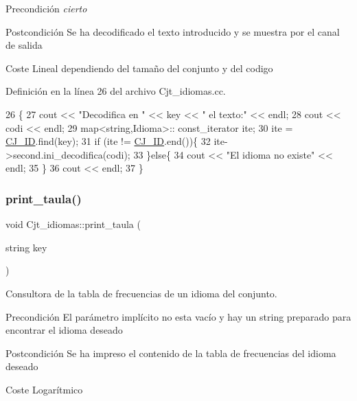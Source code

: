 \begin{DoxyPrecond}{Precondición}
{\itshape cierto} 
\end{DoxyPrecond}
\begin{DoxyPostcond}{Postcondición}
Se ha decodificado el texto introducido y se muestra por el canal de salida 
\end{DoxyPostcond}
\begin{DoxyParagraph}{Coste}
Lineal dependiendo del tamaño del conjunto y del codigo 
\end{DoxyParagraph}


Definición en la línea 26 del archivo Cjt\+\_\+idiomas.\+cc.


\begin{DoxyCode}
26                                                              \{
27   cout << \textcolor{stringliteral}{"Decodifica en "} << key << \textcolor{stringliteral}{" el texto:"} << endl;
28   cout << codi << endl;
29   map<string,Idioma>:: const\_iterator ite;
30   ite = \hyperlink{class_cjt__idiomas_aeb67a7100b1345a160fb85466bd4e5f6}{CJ\_ID}.find(key);
31   \textcolor{keywordflow}{if} (ite != \hyperlink{class_cjt__idiomas_aeb67a7100b1345a160fb85466bd4e5f6}{CJ\_ID}.end())\{
32     ite->second.ini\_decodifica(codi);
33    \}\textcolor{keywordflow}{else}\{
34     cout << \textcolor{stringliteral}{"El idioma no existe"} << endl;
35   \}
36   cout << endl;
37 \}
\end{DoxyCode}
\mbox{\label{class_cjt__idiomas_a9839ea44dc8c3ecbb10b32fe869a3498}} 
\subsubsection{\texorpdfstring{print\+\_\+taula()}{print\_taula()}}
{\footnotesize\ttfamily void Cjt\+\_\+idiomas\+::print\+\_\+taula (\begin{DoxyParamCaption}\item[{string}]{key }\end{DoxyParamCaption})}



Consultora de la tabla de frecuencias de un idioma del conjunto. 

\begin{DoxyPrecond}{Precondición}
El parámetro implícito no esta vacío y hay un string preparado para encontrar el idioma deseado 
\end{DoxyPrecond}
\begin{DoxyPostcond}{Postcondición}
Se ha impreso el contenido de la tabla de frecuencias del idioma deseado 
\end{DoxyPostcond}
\begin{DoxyParagraph}{Coste}
Logarítmico 
\end{DoxyParagraph}


